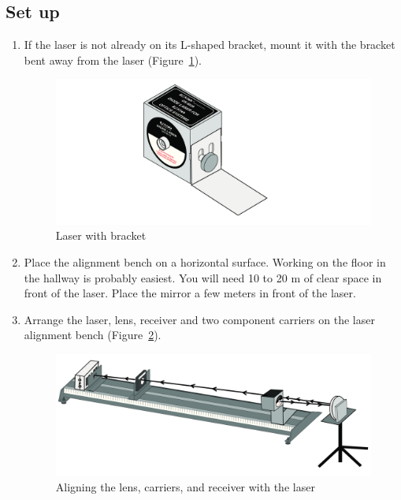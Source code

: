 \subsection{Set up}

\begin{enumerate}
\item If the laser is not already on its L-shaped bracket, mount it with the
bracket bent away from the laser (Figure~\ref{fig:laser}).
\begin{figure}[h]
\includegraphics{../images/diode-laser.jpg}
\caption{\label{fig:laser} Laser with bracket}
\end{figure}

\item Place the alignment bench on a horizontal surface. Working on the floor in the hallway is probably easiest.  You will need 
10 to 20 m of clear space in front of the laser.  Place the mirror a few meters in front of the laser.


\item Arrange the laser, lens, receiver and two component carriers on the
laser alignment bench (Figure~\ref{fig:align}).
\begin{figure}[h]
\includegraphics{../images/aligning.jpg}
\caption{\label{fig:align} Aligning the lens, carriers, and receiver with the laser }
\end{figure}


\end{enumerate}
